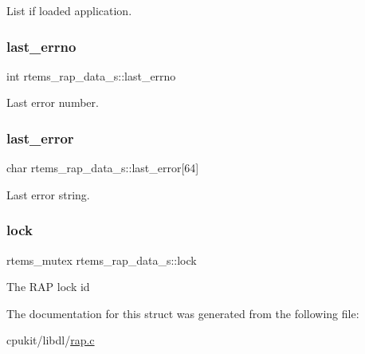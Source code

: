 List if loaded application. \mbox{\label{structrtems__rap__data__s_aea9f935a1e904b592f47926f182f7d18}} 
\subsubsection{\texorpdfstring{last\_errno}{last\_errno}}
{\footnotesize\ttfamily int rtems\+\_\+rap\+\_\+data\+\_\+s\+::last\+\_\+errno}

Last error number. \mbox{\label{structrtems__rap__data__s_a3efca1ed18363f32b766aff1d434622c}} 
\subsubsection{\texorpdfstring{last\_error}{last\_error}}
{\footnotesize\ttfamily char rtems\+\_\+rap\+\_\+data\+\_\+s\+::last\+\_\+error\mbox{[}64\mbox{]}}

Last error string. \mbox{\label{structrtems__rap__data__s_a2699326819c2d37fd7345cfc6359ef24}} 
\subsubsection{\texorpdfstring{lock}{lock}}
{\footnotesize\ttfamily rtems\+\_\+mutex rtems\+\_\+rap\+\_\+data\+\_\+s\+::lock}

The R\+AP lock id 

The documentation for this struct was generated from the following file\+:\begin{DoxyCompactItemize}
\item 
cpukit/libdl/\mbox{\hyperlink{rap_8c}{rap.\+c}}\end{DoxyCompactItemize}
